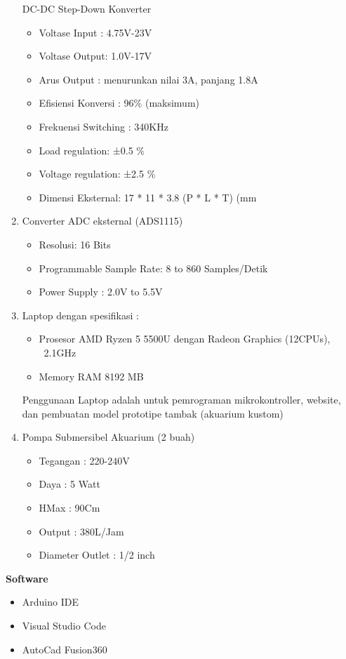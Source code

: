 \begin{enumerate}[label=(\alph*)]
\begin{itemize}
	\end{itemize}
\vspace{0.5cm}
	DC-DC Step-Down Konverter
	\begin{itemize}
	\item Voltase Input : 4.75V-23V
	\item Voltase Output: 1.0V-17V
	\item Arus Output : menurunkan nilai 3A, panjang 1.8A
	\item Efisiensi Konversi : 96\% (maksimum)
	\item Frekuensi Switching : 340KHz
	\item Load regulation: ±0.5 \%
	\item Voltage regulation: ±2.5 \%
	\item Dimensi Eksternal: 17 * 11 * 3.8 (P * L * T) (mm
	\end{itemize}
	\item Converter ADC eksternal (ADS1115)
	\begin{itemize}
	\item Resolusi: 16 Bits
	\item Programmable Sample Rate: 8 to 860 Samples/Detik
	\item Power Supply : 2.0V to 5.5V
	\end{itemize}
	\item Laptop dengan spesifikasi :
	\begin{itemize}
	\item Prosesor AMD Ryzen 5 5500U dengan Radeon Graphics (12CPUs), ~2.1GHz
	\item Memory RAM 8192 MB
	\end{itemize}
	Penggunaan Laptop adalah untuk pemrograman mikrokontroller, website, dan pembuatan model prototipe tambak (akuarium kustom)
	\item Pompa Submersibel Akuarium (2 buah)
	\begin{itemize}
	\item Tegangan : 220-240V
	\item Daya : 5 Watt
	\item HMax : 90Cm
	\item Output : 380L/Jam
	\item Diameter Outlet : 1/2 inch
	\end{itemize}
\end{enumerate}

\textbf{Software}
\begin{itemize}
	\item Arduino IDE
	\item Visual Studio Code
	\item AutoCad Fusion360
\end{itemize}


